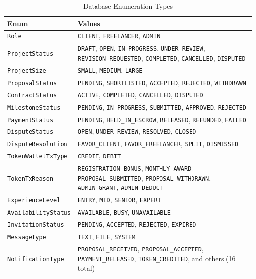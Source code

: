 \begin{table}[H]
\centering
\caption{Database Enumeration Types}
\begin{tabularx}{\textwidth}{lX}
\toprule
\textbf{Enum} & \textbf{Values} \\
\midrule
\texttt{Role}               & \texttt{CLIENT}, \texttt{FREELANCER}, \texttt{ADMIN} \\
\texttt{ProjectStatus}      & \texttt{DRAFT}, \texttt{OPEN}, \texttt{IN\_PROGRESS}, \texttt{UNDER\_REVIEW}, \texttt{REVISION\_REQUESTED}, \texttt{COMPLETED}, \texttt{CANCELLED}, \texttt{DISPUTED} \\
\texttt{ProjectSize}        & \texttt{SMALL}, \texttt{MEDIUM}, \texttt{LARGE} \\
\texttt{ProposalStatus}     & \texttt{PENDING}, \texttt{SHORTLISTED}, \texttt{ACCEPTED}, \texttt{REJECTED}, \texttt{WITHDRAWN} \\
\texttt{ContractStatus}     & \texttt{ACTIVE}, \texttt{COMPLETED}, \texttt{CANCELLED}, \texttt{DISPUTED} \\
\texttt{MilestoneStatus}    & \texttt{PENDING}, \texttt{IN\_PROGRESS}, \texttt{SUBMITTED}, \texttt{APPROVED}, \texttt{REJECTED} \\
\texttt{PaymentStatus}      & \texttt{PENDING}, \texttt{HELD\_IN\_ESCROW}, \texttt{RELEASED}, \texttt{REFUNDED}, \texttt{FAILED} \\
\texttt{DisputeStatus}      & \texttt{OPEN}, \texttt{UNDER\_REVIEW}, \texttt{RESOLVED}, \texttt{CLOSED} \\
\texttt{DisputeResolution}  & \texttt{FAVOR\_CLIENT}, \texttt{FAVOR\_FREELANCER}, \texttt{SPLIT}, \texttt{DISMISSED} \\
\texttt{TokenWalletTxType}  & \texttt{CREDIT}, \texttt{DEBIT} \\
\texttt{TokenTxReason}      & \texttt{REGISTRATION\_BONUS}, \texttt{MONTHLY\_AWARD}, \texttt{PROPOSAL\_SUBMITTED}, \texttt{PROPOSAL\_WITHDRAWN}, \texttt{ADMIN\_GRANT}, \texttt{ADMIN\_DEDUCT} \\
\texttt{ExperienceLevel}    & \texttt{ENTRY}, \texttt{MID}, \texttt{SENIOR}, \texttt{EXPERT} \\
\texttt{AvailabilityStatus} & \texttt{AVAILABLE}, \texttt{BUSY}, \texttt{UNAVAILABLE} \\
\texttt{InvitationStatus}   & \texttt{PENDING}, \texttt{ACCEPTED}, \texttt{REJECTED}, \texttt{EXPIRED} \\
\texttt{MessageType}        & \texttt{TEXT}, \texttt{FILE}, \texttt{SYSTEM} \\
\texttt{NotificationType}   & \texttt{PROPOSAL\_RECEIVED}, \texttt{PROPOSAL\_ACCEPTED}, \texttt{PAYMENT\_RELEASED}, \texttt{TOKEN\_CREDITED}, and others (16 total) \\
\bottomrule
\end{tabularx}
\end{table}

